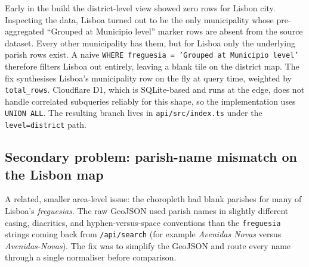 \documentclass[11pt,a4paper]{article}
\begin{document}
Early in the build the district-level view showed zero rows for Lisbon city. Inspecting the data, Lisboa turned out to be the only municipality whose pre-aggregated ``Grouped at Municipio level'' marker rows are absent from the source dataset. Every other municipality has them, but for Lisboa only the underlying parish rows exist. A naive \texttt{WHERE freguesia = 'Grouped at Municipio level'} therefore filters Lisboa out entirely, leaving a blank tile on the district map. The fix synthesises Lisboa's municipality row on the fly at query time, weighted by \texttt{total\_rows}. Cloudflare D1, which is SQLite-based and runs at the edge, does not handle correlated subqueries reliably for this shape, so the implementation uses \texttt{UNION ALL}. The resulting branch lives in \texttt{api/src/index.ts} under the \texttt{level=district} path.


\subsection{Secondary problem: parish-name mismatch on the Lisbon map}

A related, smaller area-level issue: the choropleth had blank parishes for many of Lisboa's \emph{freguesias}. The raw GeoJSON used parish names in slightly different casing, diacritics, and hyphen-versus-space conventions than the \texttt{freguesia} strings coming back from \texttt{/api/search} (for example \emph{Avenidas Novas} versus \emph{Avenidas-Novas}). The fix was to simplify the GeoJSON and route every name through a single normaliser before comparison.

\end{document}
